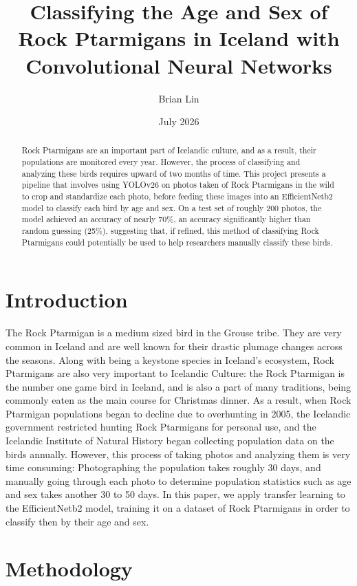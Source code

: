 \documentclass{article}
\title{Classifying the Age and Sex of Rock Ptarmigans in Iceland with Convolutional Neural Networks}
\author{Brian Lin}
\affil{Institute for Computing in Research}
\date{July 2026}
\begin{document}
\maketitle

\begin{abstract}
Rock Ptarmigans are an important part of Icelandic culture, and as a result, their populations are monitored every year. However, the process of classifying and analyzing these birds requires upward of two months of time. This project presents a pipeline that involves using YOLOv26 on photos taken of Rock Ptarmigans in the wild to crop and standardize each photo, before feeding these images into an EfficientNetb2 model to classify each bird by age and sex. On a test set of roughly 200 photos, the model achieved an accuracy of 
nearly 70\%, an accuracy significantly higher than random guessing (25\%), suggesting that, if refined, this method of classifying Rock Ptarmigans could potentially be used to help researchers manually classify these birds.
\end{abstract}


\section{Introduction}
The Rock Ptarmigan is a medium sized bird in the Grouse tribe. They are very common in Iceland and are well known for their drastic plumage changes across the seasons. Along with being a keystone species in Iceland's ecosystem, Rock Ptarmigans are also very important to Icelandic Culture: the Rock Ptarmigan is the number one game bird in Iceland, and is also a part of many traditions, being commonly eaten as the main course for Christmas dinner. As a result, when Rock Ptarmigan populations began to decline due to overhunting in 2005, the Icelandic government restricted hunting Rock Ptarmigans for personal use, and the Icelandic Institute of Natural History began collecting population data on the birds annually. However, this process of taking photos and analyzing them is very time consuming: Photographing the population takes roughly 30 days, and manually going through each photo to determine population statistics such as age and sex takes another 30 to 50 days. In this paper, we apply transfer learning to the EfficientNetb2 model, training it on a dataset of Rock Ptarmigans in order to classify then by their age and sex. 

\section{Methodology}
\end{document}
